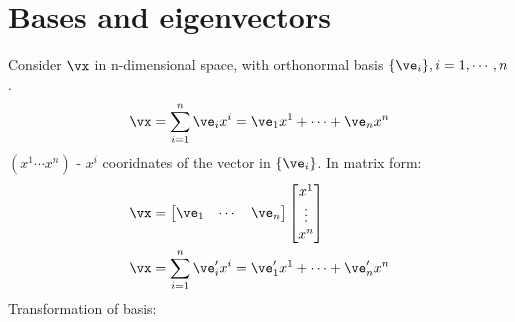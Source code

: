 \documentclass[cplx.tex]{subfiles}
\begin{document}
\section{Bases and eigenvectors}
Consider $\vx$ in n-dimensional space, with orthonormal basis $\{\ve_i\}, i = 1,\cdots,n$.
\begin{align}
    \vx &= \sum_{i=1}^n \ve_i x^i = \ve_1 x^1 + \cdots + \ve_n x^n \\
\end{align}
$(x^1\cdots x^n)$ - $x^i$ cooridnates of the vector in $\{\ve_i\}$.
In matrix form:
\begin{align}
    \vx &= \begin{bmatrix} \ve_1 & \cdots & \ve_n\end{bmatrix} \begin{bmatrix} x^1 \\ \vdots \\ x^n \end{bmatrix} \\
    \vx &= \sum_{i=1}^n \ve'_i x^i = \ve'_1 x^1 + \cdots + \ve'_n x^n
\end{align}
Transformation of basis:
\end{document}
